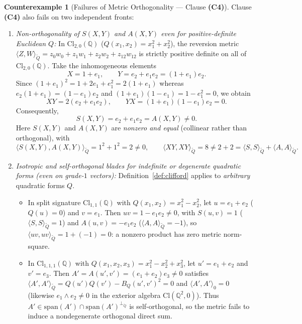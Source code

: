 \documentclass[11pt]{article}
\theoremstyle{plain}
\theoremstyle{definition}
\newtheorem{counterexample}[theorem]{Counterexample}
\theoremstyle{remark}
\newcommand{\Cl}{\mathrm{Cl}}
\begin{document}
\begin{counterexample}[Failures of Metric Orthogonality --- Clause \textbf{(C4)}]\label{cex:orthog}
Clause \textbf{(C4)} also fails on two independent fronts:
\begin{enumerate}
  \item[(a)] \emph{Non-orthogonality of $S(X, Y)$ and $A(X, Y)$ even for positive-definite Euclidean $Q$:}
  In $\Cl_{2,0}(\mathbb{Q})$ ($Q(x_1, x_2) = x_1^2 + x_2^2$), the reversion metric $\langle Z, W \rangle_{\widetilde{Q}} = z_0 w_0 + z_1 w_1 + z_2 w_2 + z_{12} w_{12}$ is strictly positive definite on all of $\Cl_{2,0}(\mathbb{Q})$. Take the inhomogeneous elements
  \[
    X = 1 + e_1, \qquad Y = e_2 + e_1 e_2 = (1 + e_1)e_2.
  \]
  Since $(1 + e_1)^2 = 1 + 2 e_1 + e_1^2 = 2(1 + e_1)$ whereas $e_2(1 + e_1) = (1 - e_1)e_2$ and $(1 + e_1)(1 - e_1) = 1 - e_1^2 = 0$, we obtain
  \[
    X Y = 2(e_2 + e_1 e_2), \qquad Y X = (1 + e_1)(1 - e_1)e_2 = 0.
  \]
  Consequently,
  \[
    S(X, Y) = e_2 + e_1 e_2 = A(X, Y) \neq 0.
  \]
  Here $S(X, Y)$ and $A(X, Y)$ are \emph{nonzero and equal} (collinear rather than orthogonal), with
  \[
    \bigl\langle S(X, Y), A(X, Y) \bigr\rangle_{\widetilde{Q}} = 1^2 + 1^2 = 2 \neq 0, \qquad
    \langle X Y, X Y \rangle_{\widetilde{Q}} = 8 \neq 2 + 2 = \langle S, S \rangle_{\widetilde{Q}} + \langle A, A \rangle_{\widetilde{Q}}.
  \]
  \item[(b)] \emph{Isotropic and self-orthogonal blades for indefinite or degenerate quadratic forms (even on grade-$1$ vectors):}
  Definition~\ref{def:clifford} applies to \emph{arbitrary} quadratic forms $Q$.
  \begin{itemize}
    \item In split signature $\Cl_{1,1}(\mathbb{Q})$ with $Q(x_1, x_2) = x_1^2 - x_2^2$, let $u = e_1 + e_2$ ($Q(u) = 0$) and $v = e_1$. Then $u v = 1 - e_1 e_2 \neq 0$, with $S(u, v) = 1$ ($\langle S, S \rangle_{\widetilde{Q}} = 1$) and $A(u, v) = -e_1 e_2$ ($\langle A, A \rangle_{\widetilde{Q}} = -1$), so $\langle u v, u v \rangle_{\widetilde{Q}} = 1 + (-1) = 0$: a nonzero product has zero metric norm-square.
    \item In $\Cl_{1,1,1}(\mathbb{Q})$ with $Q(x_1, x_2, x_3) = x_1^2 - x_2^2 + x_3^2$, let $u' = e_1 + e_2$ and $v' = e_3$. Then $A' = A(u', v') = (e_1 + e_2)e_3 \neq 0$ satisfies $\langle A', A' \rangle_{\widetilde{Q}} = Q(u')Q(v') - B_Q(u', v')^2 = 0$ and $\langle A', A' \rangle_0 = 0$ (likewise $e_1 \wedge e_2 \neq 0$ in the exterior algebra $\Cl(\mathbb{Q}^2, 0)$). Thus $A' \in \mathrm{span}(A') \cap \mathrm{span}(A')^{\perp_{\widetilde{Q}}}$ is self-orthogonal, so the metric fails to induce a nondegenerate orthogonal direct sum.
  \end{itemize}
\end{enumerate}
\end{counterexample}
\end{document}
